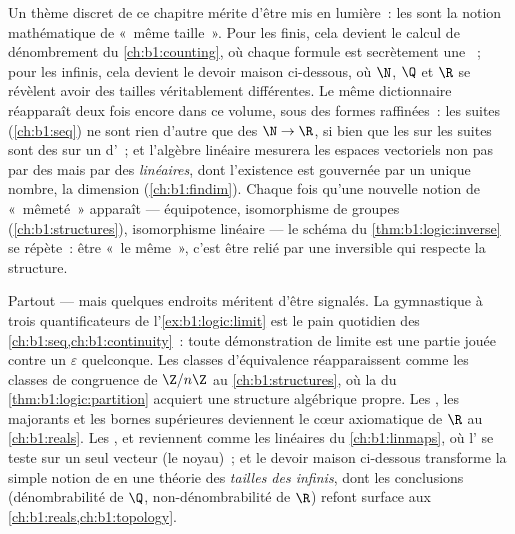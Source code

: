 \begin{remark}\label{rem:b1:logic:interlude}
Un thème discret de ce chapitre mérite d'être mis en lumière~: les
 sont la notion mathématique de «~même taille~». Pour les
 finis, cela devient le calcul de dénombrement du
\cref{ch:b1:counting}, où chaque formule est secrètement une
~; pour les  infinis, cela devient le devoir maison
ci-dessous, où $\N$, $\Q$ et $\R$ se révèlent avoir des tailles
véritablement différentes. Le même dictionnaire réapparaît deux fois
encore dans ce volume, sous des formes raffinées~: les suites
(\cref{ch:b1:seq}) ne sont rien d'autre que des  $\N \to
\R$, si bien que les  sur les suites sont des  sur
un  d'~; et l'algèbre linéaire mesurera les espaces
vectoriels non pas par des  mais par des 
\emph{linéaires}, dont l'existence est gouvernée par un unique nombre,
la dimension (\cref{ch:b1:findim}). Chaque fois qu'une nouvelle notion
de «~mêmeté~» apparaît --- équipotence, isomorphisme de groupes
(\cref{ch:b1:structures}), isomorphisme linéaire --- le schéma du
\cref{thm:b1:logic:inverse} se répète~: être «~le même~», c'est être
relié par une  inversible qui respecte la structure.
\end{remark}

\begin{remark}\label{rem:b1:logic:whereused}
Partout --- mais quelques endroits méritent d'être signalés. La
gymnastique à trois quantificateurs de l'\cref{ex:b1:logic:limit} est le
pain quotidien des \cref{ch:b1:seq,ch:b1:continuity}~: toute
démonstration de limite est une partie jouée contre un $\varepsilon$
quelconque. Les classes d'équivalence réapparaissent comme les classes
de congruence de $\Z/n\Z$ au \cref{ch:b1:structures}, où la  du
\cref{thm:b1:logic:partition} acquiert une structure algébrique propre.
Les , les majorants et les bornes supérieures
deviennent le cœur axiomatique de $\R$ au \cref{ch:b1:reals}. Les
,  et  reviennent comme les 
linéaires du \cref{ch:b1:linmaps}, où l' se teste sur un seul
vecteur (le noyau)~; et le devoir maison ci-dessous transforme la simple
notion de  en une théorie des \emph{tailles des 
infinis}, dont les conclusions (dénombrabilité de $\Q$, non-dénombrabilité
de $\R$) refont surface aux \cref{ch:b1:reals,ch:b1:topology}.
\end{remark}

